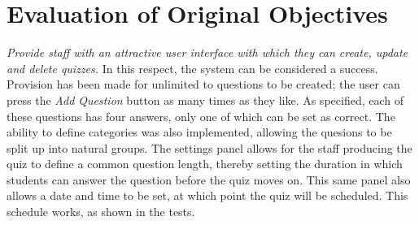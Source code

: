 \section{Evaluation of Original Objectives} %
\label{sec:evaluation_of_original_objectives}
\textit{Provide staff with an attractive user interface with which they can create, update and delete quizzes.} In this respect, the system can be considered a success. Provision has been made for unlimited to questions to be created; the user can press the \textit{Add Question} button as many times as they like. As specified, each of these questions has four answers, only one of which can be set as correct. The ability to define categories was also implemented, allowing the quesions to be split up into natural groups. The settings panel allows for the staff producing the quiz to define a common question length, thereby setting the duration in which students can answer the question before the quiz moves on. This same panel also allows a date and time to be set, at which point the quiz will be scheduled. This schedule works, as shown in the tests.

